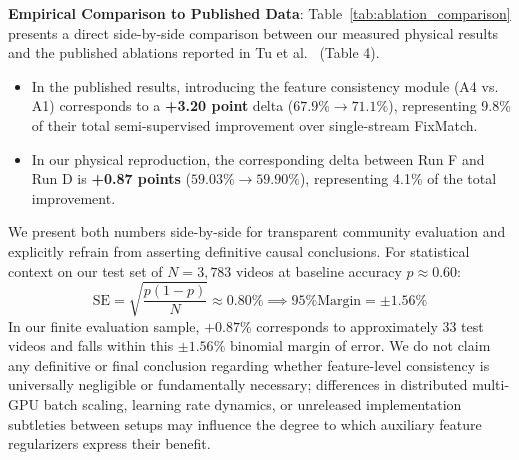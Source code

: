 \documentclass[10pt,twocolumn,a4paper]{article}
\begin{document}
\begin{table}[h]
\centering
\small
\caption{\textbf{Empirical Comparison of Feature-Level Consistency Gains}: Our physical reproduction vs. Tu et al. published ablations (Table 4) on UCF-101 Split 1.}
\label{tab:ablation_comparison}
\end{table}

\noindent \textbf{Empirical Comparison to Published Data}:  
Table~\ref{tab:ablation_comparison} presents a direct side-by-side comparison between our measured physical results and the published ablations reported in Tu et al.~\cite{tu2025f2fixmatch} (Table 4).
\begin{itemize}
    \item In the published results, introducing the feature consistency module (A4 vs. A1) corresponds to a \textbf{+3.20 point} delta ($67.9\% \to 71.1\%$), representing 9.8\% of their total semi-supervised improvement over single-stream FixMatch.
    \item In our physical reproduction, the corresponding delta between Run F and Run D is \textbf{+0.87 points} ($59.03\% \to 59.90\%$), representing 4.1\% of the total improvement.
\end{itemize}
We present both numbers side-by-side for transparent community evaluation and explicitly refrain from asserting definitive causal conclusions. For statistical context on our test set of $N = 3{,}783$ videos at baseline accuracy $p \approx 0.60$:
\begin{equation}
    \mathrm{SE} = \sqrt{\frac{p(1-p)}{N}} \approx 0.80\% \implies \text{95\% Margin} = \pm 1.56\%
\end{equation}
In our finite evaluation sample, $+0.87\%$ corresponds to approximately 33 test videos and falls within this $\pm 1.56\%$ binomial margin of error. We do not claim any definitive or final conclusion regarding whether feature-level consistency is universally negligible or fundamentally necessary; differences in distributed multi-GPU batch scaling, learning rate dynamics, or unreleased implementation subtleties between setups may influence the degree to which auxiliary feature regularizers express their benefit.
\end{document}
